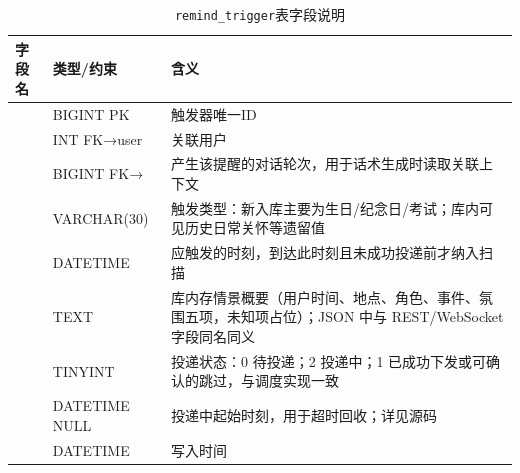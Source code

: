 \documentclass{base}
\begin{document}
\begin{table}[htbp]
    \centering
    \caption{\texttt{remind\_trigger}表字段说明}
    \label{tab:remind_trigger_fields}
    \begingroup
    \small
    \sloppy
    \setlength{\tabcolsep}{7pt}
    \renewcommand{\arraystretch}{1.36}
    \begin{tabularx}{\textwidth}{@{} >{\raggedright\arraybackslash}p{3.25cm} >{\raggedright\arraybackslash}p{2.75cm} Y @{}}
        \toprule
        \textbf{字段名}               & \textbf{类型/约束}                & \textbf{含义}                                                     \\
        \midrule
                  & BIGINT PK                     & 触发器唯一ID                                                         \\
                     & INT FK→user                   & 关联用户                                                            \\
                  & BIGINT FK→ & 产生该提醒的对话轮次，用于话术生成时读取关联上下文                                       \\
                & VARCHAR(30)                   & 触发类型：新入库主要为生日/纪念日/考试；库内可见历史日常关怀等遗留值                             \\
                & DATETIME                      & 应触发的时刻，到达此时刻且未成功投递前才纳入扫描                                        \\
             & TEXT                          & 库内存情景概要（用户时间、地点、角色、事件、氛围五项，未知项占位）；JSON 中与 REST/WebSocket 字段同名同义 \\
                & TINYINT                       & 投递状态：0 待投递；2 投递中；1 已成功下发或可确认的跳过，与调度实现一致                         \\
         & DATETIME NULL                 & 投递中起始时刻，用于超时回收；详见源码                                             \\
                 & DATETIME                      & 写入时间                                                            \\
        \bottomrule
    \end{tabularx}
    \endgroup
\end{table}
\end{document}
